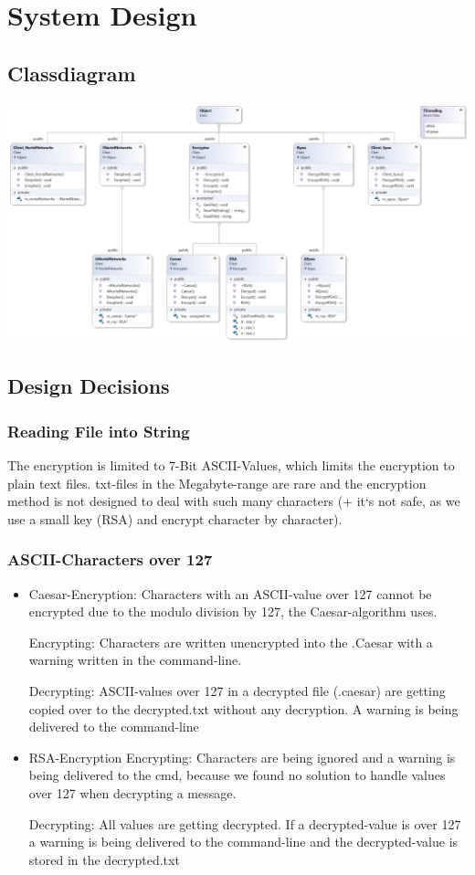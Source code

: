 \section{System Design}
\subsection{Classdiagram}
\includegraphics[scale=0.6, angle=90]{ClassDiagram}

\subsection{Design Decisions}
\subsubsection{Reading File into String}
The encryption is limited to 7-Bit ASCII-Values, which limits the encryption to plain text files. txt-files in the Megabyte-range are rare and the encryption method is not designed to deal with such many characters (+ it`s not safe, as we use a small key (RSA) and encrypt character by character).
\subsubsection{ASCII-Characters over 127}
\begin{itemize}
	\item Caesar-Encryption:	Characters with an ASCII-value over 127 cannot be encrypted due to the modulo division by 127, the Caesar-algorithm uses.	
	
	\subitem Encrypting: Characters are written unencrypted into the .Caesar with a warning written 
	\subitem in the command-line. 
	
	\subitem Decrypting: ASCII-values over 127 in a decrypted file (.caesar) are getting copied over to the decrypted.txt without any decryption. A warning is being delivered to the command-line
	
	\item RSA-Encryption
		\subitem Encrypting: Characters are being ignored and a warning is being delivered to the cmd, because we 				found no solution to handle values over 127 when decrypting a message. 
		
		\subitem Decrypting: All values are getting decrypted. If a decrypted-value is over 127 a warning is 							being delivered to the command-line and the decrypted-value is stored in the decrypted.txt
\end{itemize}


